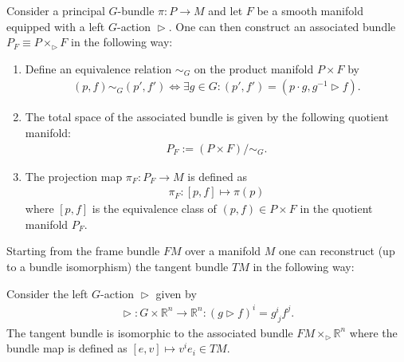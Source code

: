     \begin{construct}\label{diff:associated_bundle}
        Consider a principal $G$-bundle $\pi:P\rightarrow M$ and let $F$ be a smooth manifold equipped with a left $G$-action $\vartriangleright$. One can then construct an associated bundle $P_F\equiv P \times_\vartriangleright F$ in the following way:
        \begin{enumerate}
            \item Define an equivalence relation $\sim_G$ on the product manifold $P\times F$ by
                \begin{gather}
                    \label{diff:associated_bundle_equivalence}
                    (p,f)\sim_G (p',f')\iff\exists g\in G:(p',f') = (p\cdot g,g^{-1}\vartriangleright f).
                \end{gather}
            \item The total space of the associated bundle is given by the following quotient manifold:
                \begin{gather}
                    P_F := (P\times F)/\sim_G.
                \end{gather}
            \item The projection map $\pi_F:P_F\rightarrow M$ is defined as
                \begin{gather}
                    \pi_F:[p,f]\mapsto \pi(p)
                \end{gather}
            where $[p,f]$ is the equivalence class of $(p,f)\in P\times F$ in the quotient manifold $P_F$.
        \end{enumerate}
    \end{construct}

    \begin{example}
        Starting from the frame bundle $FM$ over a manifold $M$ one can reconstruct (up to a bundle isomorphism) the tangent bundle $TM$ in the following way:

        Consider the left $G$-action $\vartriangleright$ given by
        \begin{gather}
            \vartriangleright:G\times\mathbb{R}^n\rightarrow\mathbb{R}^n : (g\vartriangleright f)^i = g^i_{\ j}f^j.
        \end{gather}
        The tangent bundle is isomorphic to the associated bundle $FM\times_\vartriangleright\mathbb{R}^n$ where the bundle map is defined as $[e,v]\mapsto v^ie_i \in TM$.
    \end{example}

